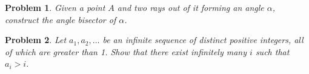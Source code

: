 \documentclass[a4paper,12pt]{article}
\theoremstyle{perfect}
\newtheorem{prb}{Problem}
\begin{document}
\begin{prb}
Given a point $A$ and two rays out of it forming an angle $\alpha$, construct the angle bisector of $\alpha$. 
\end{prb}

\begin{prb}
Let $a_1, a_2, \ldots$ be an infinite sequence of distinct positive integers, all of which are greater than 1. Show that there exist infinitely many $i$ such that $a_i > i$.
\end{prb}
\end{document}

